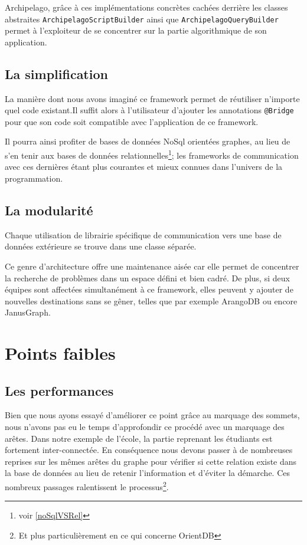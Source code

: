 \documentclass[a4paper,fleqn,12pt]{report}
\begin{document}
Archipelago, grâce à ces  implémentations concrètes cachées derrière les classes abstraites \texttt{ArchipelagoScriptBuilder} ainsi que \texttt{ArchipelagoQueryBuilder} permet à l'exploiteur de se concentrer sur la partie algorithmique de son application.

\subsection{La simplification}

La manière dont nous avons imaginé ce framework permet de réutiliser n'importe quel code existant.Il suffit alors à l'utilisateur d'ajouter les annotations \texttt{@Bridge} pour que son code soit compatible avec l'application de ce framework. 

Il pourra ainsi profiter de bases de données NoSql orientées graphes, au lieu de s'en tenir aux bases de données relationnelles\footnote{voir \ref{noSqlVSRel}}; les frameworks de communication avec ces dernières étant plus courantes et mieux connues dans l'univers de la programmation.

\subsection{La modularité}

Chaque utilisation de librairie spécifique de communication vers une base de données extérieure se trouve dans une classe séparée.

Ce genre d'architecture offre une maintenance aisée car elle permet de concentrer la recherche de problèmes dans un espace défini et bien cadré. De plus, si deux équipes sont affectées simultanément à ce framework, elles peuvent y ajouter de nouvelles destinations sans se gêner, telles que par exemple ArangoDB\cite{arangoSite} ou encore JanusGraph\cite{janusGraphSite}. 


\section{Points faibles}
\subsection{Les performances}

Bien que nous ayons essayé d'améliorer ce point grâce au marquage des sommets, nous n'avons pas eu le temps d'approfondir ce procédé avec un marquage des arêtes. Dans notre exemple de l'école, la partie reprenant les étudiants est fortement inter-connectée. En conséquence nous devons passer à de nombreuses reprises sur les mêmes arêtes du graphe pour vérifier si cette relation existe dans la base de données au lieu de retenir l'information et d'éviter la démarche. Ces nombreux passages ralentissent le processus\footnote{Et plus particulièrement en ce qui concerne OrientDB}.
\end{document}
